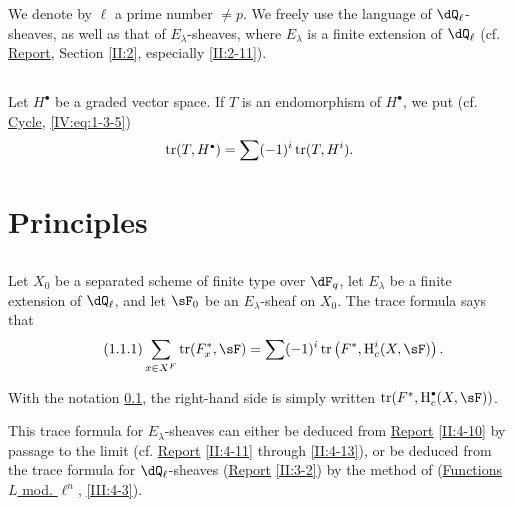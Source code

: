 We denote by $\ell$ a prime number $\ne p$. We freely use the 
language of $\dQ_\ell$-sheaves, as well as that of $E_\lambda$-sheaves, 
where $E_\lambda$ is a finite extension of $\dQ_\ell$ (cf. \hyperref[II]{Report}, 
Section \ref{II:2}, especially \ref{II:2-11}). 





\subsection{}\label{VI:0-3}

Let $H^\bullet$ be a graded vector space. If $T$ is an endomorphism of 
$H^\bullet$, we put (cf. \hyperref[IV]{Cycle}, \ref{IV:eq:1-3-5}) 
\[
  \tr(T,H^\bullet) = \sum (-1)^i \tr(T,H^i) \text{.}
\]










\section{Principles}\label{VI:1}





\subsection{}\label{VI:1-1}

Let $X_0$ be a separated scheme of finite type over $\dF_q$, let $E_\lambda$ be a 
finite extension of $\dQ_\ell$, and let $\sF_0$ be an $E_\lambda$-sheaf on $X_0$. The 
trace formula says that 
\begin{equation*}\tag{1.1.1}\label{VI:eq:1-1-1}
  \sum_{x\in X^F} \tr(F_x^\ast,\sF) = \sum (-1)^i \tr\left(F^\ast,\h_c^i(X,\sF)\right) \text{.}
\end{equation*}

With the notation \ref{VI:0-3}, the right-hand side is simply written 
$\tr(F^\ast,\h_c^\bullet(X,\sF))$. 

This trace formula for $E_\lambda$-sheaves can either be 
deduced from \hyperref[II]{Report} \ref{II:4-10} by passage to the limit (cf. 
\hyperref[II]{Report} \ref{II:4-11} through \ref{II:4-13}), or be deduced 
from the trace formula for $\dQ_\ell$-sheaves (\hyperref[II]{Report} 
\ref{II:3-2}) by the method of (\hyperref[III]{Functions $L$ mod. $\ell^n$}, 
\ref{III:4-3}). 

